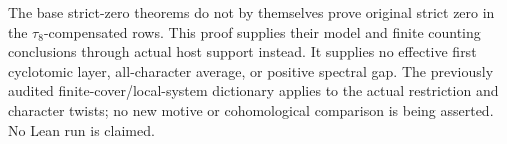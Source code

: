 The base strict-zero theorems do not by themselves prove original
strict zero in the \(\tau_8\)-compensated rows.  This proof supplies
their model and finite counting conclusions through actual host
support instead.  It supplies no effective first cyclotomic layer,
all-character average, or positive spectral gap.
The previously audited finite-cover/local-system dictionary applies
to the actual restriction and character twists; no new motive or
cohomological comparison is being asserted.  No Lean run is claimed.

